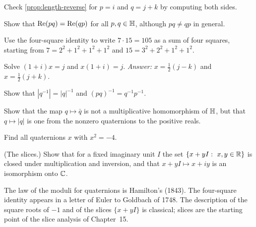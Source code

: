 \begin{exercises}
\item Check \cref{prop:length-reverse} for $p=i$ and $q=j+k$ by computing both sides.
\item Show that $\operatorname{Re}(pq)=\operatorname{Re}(qp)$ for all $p,q\in\mathbb{H}$, although $pq\neq qp$ in general.
\item Use the four-square identity to write $7\cdot 15=105$ as a sum of four squares, starting from $7=2^2+1^2+1^2+1^2$ and $15=3^2+2^2+1^2+1^2$.
\item Solve $(1+i)x=j$ and $x(1+i)=j$. \emph{Answer:} $x=\tfrac12(j-k)$ and $x=\tfrac12(j+k)$.
\item Show that $|q^{-1}|=|q|^{-1}$ and $(pq)^{-1}=q^{-1}p^{-1}$.
\item Show that the map $q\mapsto\bar q$ is not a multiplicative homomorphism of $\mathbb{H}$, but that $q\mapsto |q|$ is one from the nonzero quaternions to the positive reals.
\item Find all quaternions $x$ with $x^2=-4$.
\item (The slices.) Show that for a fixed imaginary unit $I$ the set $\{x+yI:\ x,y\in\mathbb{R}\}$ is closed under multiplication and inversion, and that $x+yI\mapsto x+iy$ is an isomorphism onto $\mathbb{C}$.
\end{exercises}

\begin{sources}
The law of the moduli for quaternions is Hamilton's (1843). The four-square identity appears in a letter of Euler to Goldbach of 1748. The description of the square roots of $-1$ and of the slices $\{x+yI\}$ is classical; slices are the starting point of the slice analysis of Chapter~15.
\end{sources}
